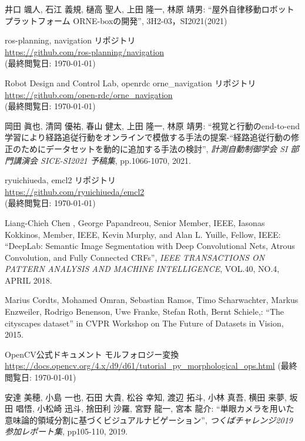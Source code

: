 \documentclass[uplatex, twocolumn, 9pt]{jsproceedings}
\begin{document}

\footnotesize
\begin{thebibliography}{99}

井口 颯人, 石江 義規, 樋高 聖人, 上田 隆一, 林原 靖男: ``屋外自律移動ロボットプラットフォーム ORNE-boxの開発'', 3H2-03，SI2021(2021)

ros-planning, navigation リポジトリ\\
\url{https://github.com/ros-planning/navigation}\\
(最終閲覧日: \today)

Robot Design and Control Lab, openrdc orne\_navigation リポジトリ\\
\url{https://github.com/open-rdc/orne_navigation}\\
(最終閲覧日: \today)

岡田 眞也, 清岡 優祐, 春山 健太, 上田 隆一, 林原 靖男: ``視覚と行動のend-to-end学習により経路追従行動をオンラインで模倣する手法の提案-“経路追従行動の修正のためにデータセットを動的に追加する手法の検討'', \textit{計測自動制御学会 SI 部門講演会 SICE-SI2021 予稿集}, pp.1066-1070, 2021.

\newpage
{}
ryuichiueda, emcl2 リポジトリ\\
\url{https://github.com/ryuichiueda/emcl2}\\
(最終閲覧日: \today)

Liang-Chieh Chen , George Papandreou, Senior Member, IEEE, Iasonas Kokkinos, Member, IEEE,
Kevin Murphy, and Alan L. Yuille, Fellow, IEEE: ``DeepLab: Semantic Image Segmentation with
Deep Convolutional Nets, Atrous Convolution, and Fully Connected CRFs'', \textit{IEEE TRANSACTIONS ON PATTERN ANALYSIS AND MACHINE INTELLIGENCE}, VOL.40, NO.4, APRIL 2018.

Marius Cordts, Mohamed Omran, Sebastian Ramos, Timo Scharwachter, Markus Enzweiler, Rodrigo Benenson, Uwe Franke, Stefan Roth, Bernt Schiele,: ``The cityscapes dataset'' in CVPR Workshop on The Future of Datasets in Vision, 2015.

OpenCV公式ドキュメント モルフォロジー変換\\
\url{https://docs.opencv.org/4.x/d9/d61/tutorial_py_morphological_ops.html}
(最終閲覧日: \today)

安達 美穂, 小島 一也, 石田 大貴, 松谷 幸知, 渡辺 拓斗, 小林 真吾, 横田 来夢, 坂田 唱悟, 小松崎 迅斗, 捨田利 沙羅, 宮野 龍一, 宮本 龍介: ``単眼カメラを用いた意味論的領域分割に基づくビジュアルナビゲーション'', \textit{つくばチャレンジ2019 参加レポート集}, pp105-110, 2019.


\end{thebibliography}
\end{document}
